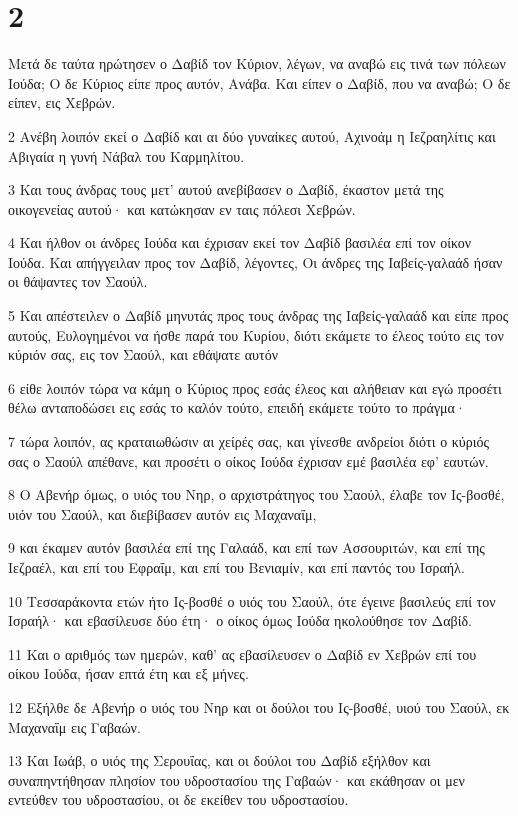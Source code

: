 \chapter{2}

\par Μετά δε ταύτα ηρώτησεν ο Δαβίδ τον Κύριον, λέγων, να αναβώ εις τινά των πόλεων Ιούδα; Ο δε Κύριος είπε προς αυτόν, Ανάβα. Και είπεν ο Δαβίδ, που να αναβώ; Ο δε είπεν, εις Χεβρών.
\par 2 Ανέβη λοιπόν εκεί ο Δαβίδ και αι δύο γυναίκες αυτού, Αχινοάμ η Ιεζραηλίτις και Αβιγαία η γυνή Νάβαλ του Καρμηλίτου.
\par 3 Και τους άνδρας τους μετ' αυτού ανεβίβασεν ο Δαβίδ, έκαστον μετά της οικογενείας αυτού· και κατώκησαν εν ταις πόλεσι Χεβρών.
\par 4 Και ήλθον οι άνδρες Ιούδα και έχρισαν εκεί τον Δαβίδ βασιλέα επί τον οίκον Ιούδα. Και απήγγειλαν προς τον Δαβίδ, λέγοντες, Οι άνδρες της Ιαβείς-γαλαάδ ήσαν οι θάψαντες τον Σαούλ.
\par 5 Και απέστειλεν ο Δαβίδ μηνυτάς προς τους άνδρας της Ιαβείς-γαλαάδ και είπε προς αυτούς, Ευλογημένοι να ήσθε παρά του Κυρίου, διότι εκάμετε το έλεος τούτο εις τον κύριόν σας, εις τον Σαούλ, και εθάψατε αυτόν
\par 6 είθε λοιπόν τώρα να κάμη ο Κύριος προς εσάς έλεος και αλήθειαν και εγώ προσέτι θέλω ανταποδώσει εις εσάς το καλόν τούτο, επειδή εκάμετε τούτο το πράγμα·
\par 7 τώρα λοιπόν, ας κραταιωθώσιν αι χείρές σας, και γίνεσθε ανδρείοι διότι ο κύριός σας ο Σαούλ απέθανε, και προσέτι ο οίκος Ιούδα έχρισαν εμέ βασιλέα εφ' εαυτών.
\par 8 Ο Αβενήρ όμως, ο υιός του Νηρ, ο αρχιστράτηγος του Σαούλ, έλαβε τον Ις-βοσθέ, υιόν του Σαούλ, και διεβίβασεν αυτόν εις Μαχαναΐμ,
\par 9 και έκαμεν αυτόν βασιλέα επί της Γαλαάδ, και επί των Ασσουριτών, και επί της Ιεζραέλ, και επί του Εφραΐμ, και επί του Βενιαμίν, και επί παντός του Ισραήλ.
\par 10 Τεσσαράκοντα ετών ήτο Ις-βοσθέ ο υιός του Σαούλ, ότε έγεινε βασιλεύς επί τον Ισραήλ· και εβασίλευσε δύο έτη· ο οίκος όμως Ιούδα ηκολούθησε τον Δαβίδ.
\par 11 Και ο αριθμός των ημερών, καθ' ας εβασίλευσεν ο Δαβίδ εν Χεβρών επί του οίκου Ιούδα, ήσαν επτά έτη και εξ μήνες.
\par 12 Εξήλθε δε Αβενήρ ο υιός του Νηρ και οι δούλοι του Ις-βοσθέ, υιού του Σαούλ, εκ Μαχαναΐμ εις Γαβαών.
\par 13 Και Ιωάβ, ο υιός της Σερουΐας, και οι δούλοι του Δαβίδ εξήλθον και συναπηντήθησαν πλησίον του υδροστασίου της Γαβαών· και εκάθησαν οι μεν εντεύθεν του υδροστασίου, οι δε εκείθεν του υδροστασίου.

